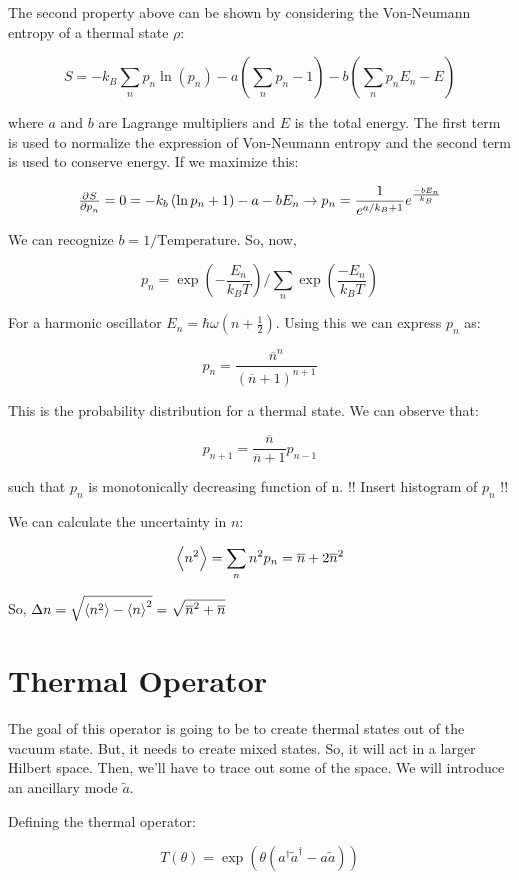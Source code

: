 \documentclass{article}
\begin{document}
The second property above can be shown by considering the Von-Neumann entropy of
a thermal state $\rho$:

\[
   S = -k_B \sum_n p_n \ln(p_n) - a (\sum_n p_n - 1) - b ( \sum_n p_n E_n -E )
\]

where $ a $ and $ b $ are Lagrange multipliers and $ E $ is the total energy.
The first term is used to normalize the expression of Von-Neumann entropy and
the second term is used to conserve energy. If we maximize this:

\[
   \pd{S}{p_n} = 0 = -k_b \left( \ln p_n + 1 \right) - a - b E_n \rightarrow 
   p_n = \frac{1}{e^{a/k_B + 1}}e^{\frac{-b E_n}{k_B}}
\]

We can recognize $ b = 1/\text{Temperature} $. So, now,

\[
   p_n = \exp(-\frac{E_n}{k_B T}) / \sum_n \exp(\frac{-E_n}{k_B T})
\]

For a harmonic oscillator $ E_n = \hbar \omega \left( n + \frac{1}{2} \right) $.
Using this we can express $ p_n $ as:

\[
   p_n = \frac{\overline{n}^n}{\left( \overline{n} + 1 \right)^{n+1}}
\]

This is the probability distribution for a thermal state. We can observe that:

\[
   p_{n+1} = \frac{\overline{n}}{\overline{n} +1 } p_{n-1}
\]

such that $p_n$ is monotonically decreasing function of n.
!! Insert histogram of $ p_n $ !!


We can calculate the uncertainty in $ n $:

\[
   \Braket{n^2} = \sum_n n^2 p_n = \overline{n} + 2 \overline{n}^2
\]

So, $ \Delta n = \sqrt{\Braket{n^2} - \Braket{n}^2} = \sqrt{ \overline{n}^2 +
\overline{n}}$ 

\section{Thermal Operator}
\label{sec:thermal_operator}
The goal of this operator is going to be to create thermal states out of the
vacuum state. But, it needs to create mixed states. So, it will act in a larger
Hilbert space. Then, we'll have to trace out some of the space. We will
introduce an ancillary mode $\tilde{a}$.

Defining the thermal operator:

\[
   T(\theta) = \exp(\theta(a^\dagger \tilde{a}^\dagger - a \tilde{a}))
\]
\end{document}
